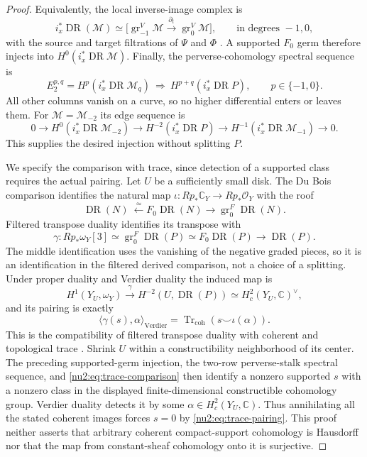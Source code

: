 \begin{proof}
Equivalently, the local inverse-image complex is
\[
 i_x^*\operatorname{DR}(\mathcal M)\simeq
 \bigl[\operatorname{gr}_{-1}^V\mathcal M
       \xrightarrow{\ \partial_t\ }
       \operatorname{gr}_0^V\mathcal M\bigr],
 \qquad\text{in degrees }-1,0,
\]
with the source and target filtrations of $\Psi$ and $\Phi$
\cite[(30.3)]{Schnell2014}.  A supported $F_0$ germ therefore injects
into $H^0(i_x^*\operatorname{DR}\mathcal M)$.
Finally, the perverse-cohomology spectral sequence is
\[
 E_2^{p,q}=H^p(i_x^*\operatorname{DR}\mathcal M_q)
 \ \Longrightarrow\ H^{p+q}(i_x^*\operatorname{DR}P),
 \qquad p\in\{-1,0\}.
\]
All other columns vanish on a curve, so no higher differential enters
or leaves them.  For $\mathcal M=\mathcal M_{-2}$ its edge sequence is
\[
 0\longrightarrow H^0(i_x^*\operatorname{DR}\mathcal M_{-2})
 \longrightarrow H^{-2}(i_x^*\operatorname{DR}P)
 \longrightarrow H^{-1}(i_x^*\operatorname{DR}\mathcal M_{-1})
 \longrightarrow0.
\]
This supplies the desired injection without splitting $P$.

We specify the comparison with trace, since detection of a supported
class requires the actual pairing.  Let $U$ be a sufficiently small
disk.  The Du Bois comparison identifies the natural map
$\iota:Rp_*\mathbb C_Y\to Rp_*\mathcal O_Y$ with the roof
\[
 \operatorname{DR}(N)\ \xleftarrow{\ \simeq\ }
 F_0\operatorname{DR}(N)\longrightarrow
 \operatorname{gr}_0^F\operatorname{DR}(N).
\]
Filtered transpose duality identifies its transpose with
\begin{equation}\label{nu2:eq:trace-comparison}
 \gamma:Rp_*\omega_Y[3]\simeq
 \operatorname{gr}_0^F\operatorname{DR}(P)
 \simeq F_0\operatorname{DR}(P)
 \longrightarrow\operatorname{DR}(P).
\end{equation}
The middle identification uses the vanishing of the negative graded
pieces, so it is an identification in the filtered derived
comparison, not a choice of a splitting.  Under proper duality and
Verdier duality the induced map is
\[
 H^1(Y_U,\omega_Y)\xrightarrow{\ \gamma\ }
 H^{-2}(U,\operatorname{DR}(P))
 \simeq H_c^2(Y_U,\mathbb C)^\vee,
\]
and its pairing is exactly
\begin{equation}\label{nu2:eq:trace-pairing}
 \langle\gamma(s),\alpha\rangle_{\mathrm{Verdier}}
 =\operatorname{Tr}_{\mathrm{coh}}
       (s\smile\iota(\alpha)).
\end{equation}
This is the compatibility of filtered transpose duality with coherent
and topological trace
\cite[Sections~2.6--2.12 and 3.7--3.13]{Saito1989}.
Shrink $U$ within a constructibility neighborhood of its center.
The preceding supported-germ injection, the two-row perverse-stalk
spectral sequence, and \eqref{nu2:eq:trace-comparison} then identify a
nonzero supported $s$ with a nonzero class in the displayed
finite-dimensional constructible cohomology group.  Verdier duality
detects it by some $\alpha\in H_c^2(Y_U,\mathbb C)$.  Thus annihilating
all the stated coherent images forces $s=0$ by
\eqref{nu2:eq:trace-pairing}.  This proof neither asserts that arbitrary
coherent compact-support cohomology is Hausdorff nor that the map
from constant-sheaf cohomology onto it is surjective.
\end{proof}


